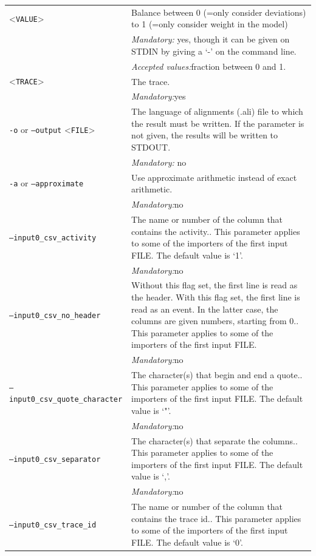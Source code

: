{\begin{tabularx}{\linewidth}{lX}
<\texttt{VALUE}>&Balance between 0 (=only consider deviations) to 1 (=only consider weight in the model)\\
&\textit{Mandatory:} \quad yes, though it can be given on STDIN by giving a `-' on the command line.\\
&\textit{Accepted values:}\quad fraction between 0 and 1.\\
<\texttt{TRACE}>
&The trace.\\
&\textit{Mandatory:}\quad yes\\
\texttt{-o} or \texttt{--output} <\texttt{FILE}> &
The language of alignments (.ali) file to which the result must be written. If the parameter is not given, the results will be written to STDOUT.\\
&\textit{Mandatory:} \quad no\\
\texttt{-a} or \texttt{--approximate} & Use approximate arithmetic instead of exact arithmetic.\\
&\textit{Mandatory:}\quad no\\
\texttt{--input0\_csv\_activity} & The name or number of the column that contains the activity.. This parameter applies to some of the importers of the first input FILE. The default value is `1'.\\
&\textit{Mandatory:}\quad no\\
\texttt{--input0\_csv\_no\_header} & Without this flag set, the first line is read as the header. 
    With this flag set, the first line is read as an event. In the latter case, the columns are given numbers, starting from 0.. This parameter applies to some of the importers of the first input FILE. \\
&\textit{Mandatory:}\quad no\\
\texttt{--input0\_csv\_quote\_character} & The character(s) that begin and end a quote.. This parameter applies to some of the importers of the first input FILE. The default value is `"'.\\
&\textit{Mandatory:}\quad no\\
\texttt{--input0\_csv\_separator} & The character(s) that separate the columns.. This parameter applies to some of the importers of the first input FILE. The default value is `,'.\\
&\textit{Mandatory:}\quad no\\
\texttt{--input0\_csv\_trace\_id} & The name or number of the column that contains the trace id.. This parameter applies to some of the importers of the first input FILE. The default value is `0'.\\

\end{tabularx}}
